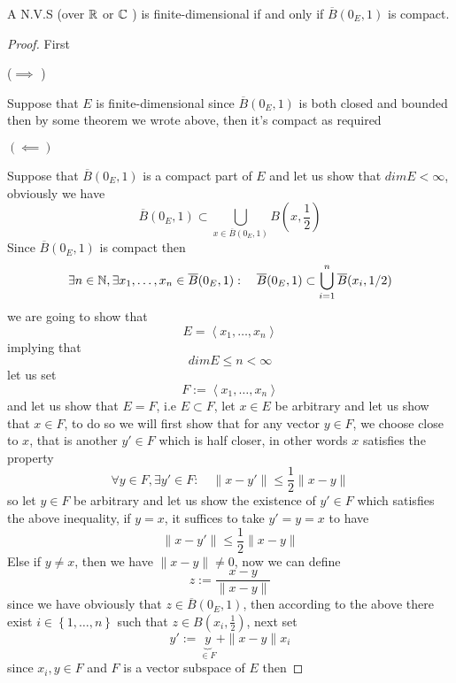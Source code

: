 % 
% 

\lecday[2025-03-03]

% 

\begin{theorem}
	A N.V.S (over $\mathbb{R}  $ or $\mathbb{C}  $ ) is finite-dimensional 
	if and only if $\overline{B}(0_{E},1)  $ is compact.
\end{theorem}
\begin{proof}
First 
\begin{center}
	($ \implies  $ )
\end{center}
Suppose that $E $ is finite-dimensional since $\overline{B}(0_{E},1)  $ is both 
closed and bounded then by some theorem we wrote above, 
then it's compact as required 
\begin{center}
	$( \impliedby )  $ 
\end{center}
Suppose that $\overline{B}(0_{E},1)  $ is a compact part of $E $ and 
let us show that $dim E < \infty  $, obviously we have
\[
\overline{B}(0_{E},1)  \subset \bigcup_{x \in  \overline{B}(0_{E},1) }^{}  
B \left( x, \frac{1}{2} \right)
\]
Since $\overline{B}(0_{E},1)  $ is compact then 
\[
\exists  n \in \mathbb{N}, \exists  x_1, \hdots , x_{n} \in \overline{B}(0_{E},1)  : \quad 
\overline{B}(0_{E},1)  \subset \bigcup_{i=1}^{n} 
\overline{B}(x_{i},1/2) 
\]
we are going to show that 
\[
E = \left\langle x_1, \hdots , x_{n} \right\rangle 
\]
implying that 
\[
dim E \leq n < \infty 
\]
let us set 
\[
F := \left\langle x_1, \hdots , x_{n} \right\rangle 
\]
and let us show that $E  = F$, i.e $E \subset F $, let 
$x \in E $ be arbitrary and let us show that $x \in F $, to do so we will first
show that for any vector $y \in F $, we choose close to $x $, that is another 
$y' \in F $ which is half closer, in other words $x  $ satisfies the property 
\[
\forall y \in F, \exists y' \in F : \quad 
\| x - y' \|  \leq  \frac{1}{2} \| x-y \| 
\]
so let $y \in  F $  be arbitrary and let us show the existence of 
$y'  \in  F $ which satisfies the above inequality, if $y = x$, it suffices 
to take $y' = y  = x$ to have 
\[
\| x-y' \|  \leq \frac{1}{2}\| x-y \| 
\]
Else if $y \neq x $, then we have $\|  x- y \|  \neq 0 $, now we can define  
\[
	z := \frac{x-y}{\| x-y \| }
\]
since we have obviously that $z \in  \overline{B}(0_{E},1)  $, then according to the above
there exist $i \in  \left\{ 1, \hdots , n \right\} $ such that 
$z \in B (x_{i}, \frac{1}{2})$,  next set 
\[
y' := 
\underbrace{y}_{ \in  F} 
+ \| x-y \| x_{i}
\]
since $x_{i},y \in F $ and $F$ is a vector subspace of $E $ then

\end{proof}
